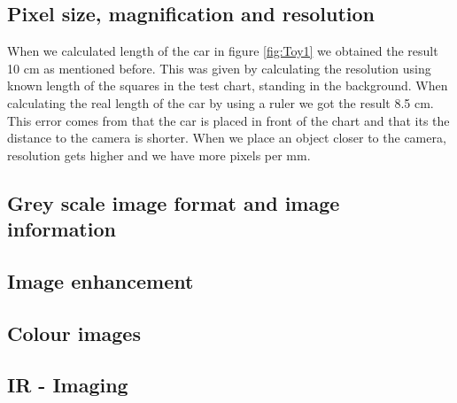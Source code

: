 \subsection{Pixel size, magnification and resolution}
When we calculated length of the car in figure \ref{fig:Toy1} we obtained the result 10 cm as mentioned before. This was given by calculating the resolution using known length of the squares in the test chart, standing in the background. When calculating the real length of the car by using a ruler we got the result 8.5 cm. This error comes from that the car is placed in front of the chart and that its the distance to the camera is shorter. When we place an object closer to the camera, resolution gets higher and we have more pixels per mm. 

\subsection{Grey scale image format and image information}
\subsection{Image enhancement}
\subsection{Colour images}
\subsection{IR - Imaging}



